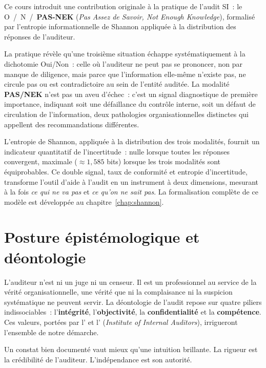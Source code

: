 Ce cours introduit une contribution originale à la pratique de l'audit SI~: le  O~/~N~/~\textbf{PAS-NEK} (\textit{Pas Assez de Savoir, Not Enough Knowledge}), formalisé par l'entropie informationnelle de Shannon appliquée à la distribution des réponses de l'auditeur.

La pratique révèle qu'une troisième situation échappe systématiquement à la dichotomie Oui/Non~: celle où l'auditeur ne peut pas se prononcer, non par manque de diligence, mais parce que l'information elle-même n'existe pas, ne circule pas ou est contradictoire au sein de l'entité auditée. La modalité \textbf{PAS/NEK} n'est pas un aveu d'échec~: c'est un signal diagnostique de première importance, indiquant soit une défaillance du contrôle interne, soit un défaut de circulation de l'information, deux pathologies organisationnelles distinctes qui appellent des recommandations différentes.

L'entropie de Shannon, appliquée à la distribution des trois modalités, fournit un indicateur quantitatif de l'incertitude~: nulle lorsque toutes les réponses convergent, maximale ($\approx 1{,}585$ bits) lorsque les trois modalités sont équiprobables. Ce double signal, taux de conformité et entropie d'incertitude, transforme l'outil d'aide à l'audit en un instrument à deux dimensions, mesurant à la fois \textit{ce qui ne va pas} et \textit{ce qu'on ne sait pas}. La formalisation complète de ce modèle est développée au chapitre~\ref{chap:shannon}.

\section*{Posture épistémologique et déontologie}

L'auditeur n'est ni un juge ni un censeur. Il est un professionnel au service de la vérité organisationnelle, une vérité que ni la complaisance ni la suspicion systématique ne peuvent servir. La déontologie de l'audit repose sur quatre piliers indissociables~: l'\textbf{intégrité}, l'\textbf{objectivité}, la \textbf{confidentialité} et la \textbf{compétence}. Ces valeurs, portées par l' et l' (\textit{Institute of Internal Auditors}), irrigueront l'ensemble de notre démarche.

Un constat bien documenté vaut mieux qu'une intuition brillante. La rigueur est la crédibilité de l'auditeur. L'indépendance est son autorité.

